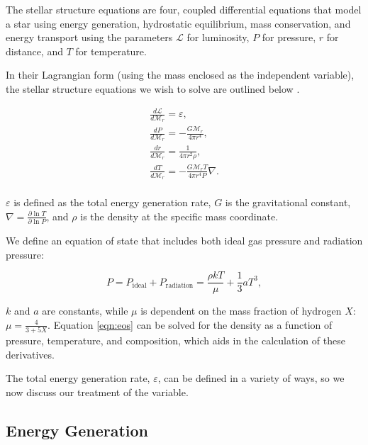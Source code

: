 \documentclass[twocolumn]{aastex631}
\begin{document}
The stellar structure equations are four, coupled differential equations that model a star using energy generation, hydrostatic equilibrium, mass conservation, and energy transport using the parameters $\mathcal{L}$ for luminosity, $P$ for pressure, $r$ for distance, and $T$ for temperature.

In their Lagrangian form (using the mass enclosed as the independent variable), the stellar structure equations we wish to solve are outlined below \citep{stelstrucev}.

\begin{equation}
\boxed{
\begin{array}{lcl}
\frac{d\mathcal{L}}{d\mathcal{M}_r} = \varepsilon, \\
\frac{d P}{d\mathcal{M}_r} = - \frac{G\mathcal{M}_r}{4\pi r^4}, \\
\frac{d r}{d\mathcal{M}_r} = \frac{1}{4\pi r^2\rho}, \\
\frac{d T}{d\mathcal{M}_r} = -\frac{G\mathcal{M}_r T}{4\pi r^4 P}\nabla. \\
\end{array}
}
\end{equation}

\noindent$\varepsilon$ is defined as the total energy generation rate, $G$ is the gravitational constant, $\nabla = \frac{\partial \ln{T}}{\partial \ln{P}}$, and $\rho$ is the density at the specific mass coordinate.

We define an equation of state that includes both ideal gas pressure and radiation pressure:

\begin{equation}
	\label{eqn:eos}
	P = P_\text{ideal} + P_\text{radiation} = \frac{\rho k T}{\mu} + \frac{1}{3}aT^3,
\end{equation}

\noindent$k$ and $a$ are constants, while $\mu$ is dependent on the mass fraction of hydrogen $X$: $\mu = \frac{4}{3 + 5X}$. Equation \ref{eqn:eos} can be solved for the density as a function of pressure, temperature, and composition, which aids in the calculation of these derivatives. 

The total energy generation rate, $\varepsilon$, can be defined in a variety of ways, so we now discuss our treatment of the variable.

\subsection{Energy Generation}
\end{document}
